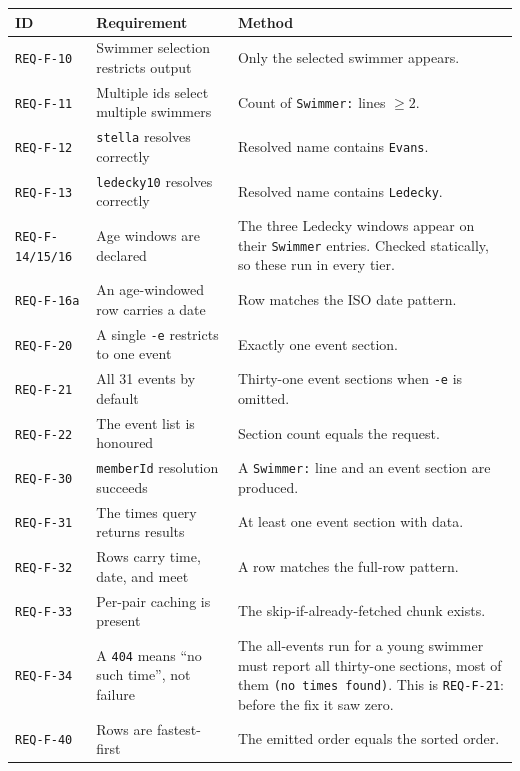 \documentclass[12pt]{article}
\newcommand{\code}[1]{\texttt{#1}}
\newcommand{\req}[1]{\texttt{#1}}
\begin{document}
\begin{center}
\begin{longtable}{p{2.1cm}p{5.2cm}p{6.2cm}}
  \toprule
  \textbf{ID} & \textbf{Requirement} & \textbf{Method} \\
  \midrule\endhead
  \req{REQ-F-10} & Swimmer selection restricts output
    & Only the selected swimmer appears. \\
  \req{REQ-F-11} & Multiple ids select multiple swimmers
    & Count of \code{Swimmer:} lines $\geq 2$. \\
  \req{REQ-F-12} & \code{stella} resolves correctly
    & Resolved name contains \code{Evans}. \\
  \req{REQ-F-13} & \code{ledecky10} resolves correctly
    & Resolved name contains \code{Ledecky}. \\
  \req{REQ-F-14/15/16} & Age windows are declared
    & The three Ledecky windows appear on their \code{Swimmer}
      entries.  Checked statically, so these run in every tier. \\
  \req{REQ-F-16a} & An age-windowed row carries a date
    & Row matches the ISO date pattern. \\
  \req{REQ-F-20} & A single \code{-e} restricts to one event
    & Exactly one event section. \\
  \req{REQ-F-21} & All 31 events by default
    & Thirty-one event sections when \code{-e} is omitted. \\
  \req{REQ-F-22} & The event list is honoured
    & Section count equals the request. \\
  \req{REQ-F-30} & \code{memberId} resolution succeeds
    & A \code{Swimmer:} line and an event section are produced. \\
  \req{REQ-F-31} & The times query returns results
    & At least one event section with data. \\
  \req{REQ-F-32} & Rows carry time, date, and meet
    & A row matches the full-row pattern. \\
  \req{REQ-F-33} & Per-pair caching is present
    & The skip-if-already-fetched chunk exists. \\
  \req{REQ-F-34} & A \code{404} means ``no such time'', not failure
    & The all-events run for a young swimmer must report all
      thirty-one sections, most of them \code{(no times found)}.  This
      is \req{REQ-F-21}: before the fix it saw zero. \\
  \req{REQ-F-40} & Rows are fastest-first
    & The emitted order equals the sorted order. \\

\end{longtable}
\end{center}
\end{document}

